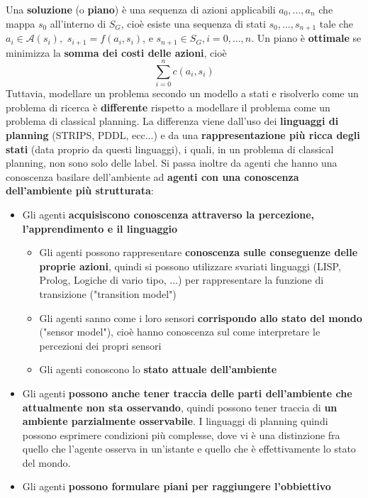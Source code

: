\documentclass[12pt]{article}
\begin{document}
Una \textbf{soluzione} (o \textbf{piano}) è una sequenza di azioni applicabili $a_0, \dots, a_n$ che mappa $s_0$ all'interno di $S_G$, cioè
esiste una sequenza di stati $s_0, \dots, s_{n+1}$ tale che $a_i \in \mathcal{A}(s_i),$ \newline  $s_{i+1} = f(a_i, s_i)$, e $s_{n+1} \in S_G, i = 0,\dots,n$.
Un piano è \textbf{ottimale} se minimizza la \textbf{somma dei costi delle azioni}, cioè
$$\sum_{i=0}^n c(a_i, s_i)$$
Tuttavia, modellare un problema secondo un modello a stati e risolverlo come un problema di ricerca è \textbf{differente} rispetto a modellare il problema come un problema di classical planning.
La differenza viene dall'uso dei \textbf{linguaggi di planning} (STRIPS, PDDL, ecc...) e da una \textbf{rappresentazione più ricca degli stati} (data proprio da questi linguaggi), i quali, in un problema di classical planning, non sono solo
delle label. Si passa inoltre da agenti che hanno una conoscenza basilare dell'ambiente ad \textbf{agenti con una conoscenza dell'ambiente più strutturata}:
\begin{itemize}
    \item Gli agenti \textbf{acquisiscono conoscenza attraverso la percezione, \newline l'apprendimento  e il linguaggio}
    \begin{itemize}
        \item Gli agenti possono rappresentare \textbf{conoscenza sulle conseguenze delle proprie azioni}, quindi si possono utilizzare svariati linguaggi (LISP, Prolog, Logiche di vario tipo, ...) per rappresentare la funzione di transizione ("transition model")
        \item Gli agenti sanno come i loro sensori \textbf{corrispondo allo stato del mondo} ("sensor model"), cioè hanno conoscenza sul come interpretare le percezioni dei propri sensori
        \item Gli agenti conoscono lo \textbf{stato attuale dell'ambiente}
    \end{itemize}
    \item Gli agenti \textbf{possono anche tener traccia delle parti dell'ambiente che attualmente non sta osservando}, quindi possono tener traccia di \textbf{un ambiente parzialmente osservabile}. I linguaggi di planning quindi possono esprimere condizioni più complesse, dove vi è una distinzione fra quello che l'agente osserva in un'istante  e quello che è effettivamente lo stato del mondo.
    \item Gli agenti \textbf{possono formulare piani per raggiungere l'obbiettivo}
\end{itemize}
\end{document}

